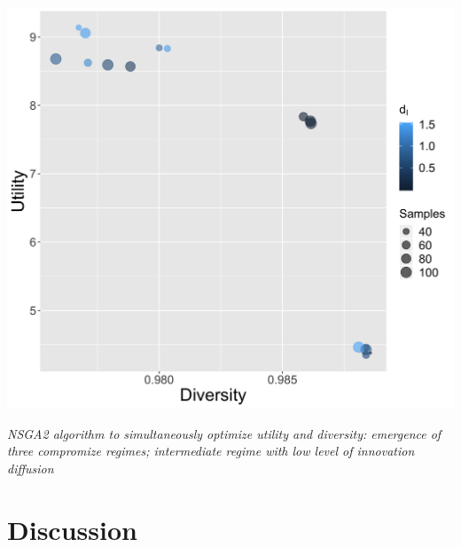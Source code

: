 {\begin{center}
	\includegraphics[width=0.6\linewidth]{figures/paretoDiversity-Utility_colorinnovationDecay.png}
\end{center}

\footnotesize

\textit{NSGA2 algorithm to simultaneously optimize utility and diversity: emergence of three compromize regimes; intermediate regime with low level of innovation diffusion}




}




\section{Discussion}



